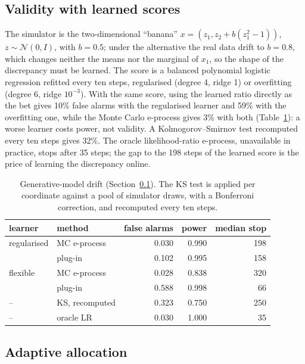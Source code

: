 \documentclass[12pt]{article}
\theoremstyle{remark}
\def\spacingset#1{\renewcommand{\baselinestretch}%
{#1}\small\normalsize} \spacingset{1}
\begin{document}
\subsection{Validity with learned scores}\label{sec:exp-drift}

The simulator is the two-dimensional ``banana''
$x = (z_1, z_2 + b(z_1^2 - 1))$, $z \sim \mathcal N(0, I)$, with $b = 0.5$; under
the alternative the real data drift to $b = 0.8$, which changes neither the
means nor the marginal of $x_1$, so the shape of the discrepancy must be
learned. The score is a balanced polynomial logistic regression refitted every
ten steps, regularised (degree 4, ridge 1) or overfitting (degree 6, ridge
$10^{-3}$). With the same score, using the learned ratio directly as the bet
gives 10\% false alarms with the regularised learner and 59\% with the
overfitting one, while the Monte Carlo e-process gives 3\% with both
(Table~\ref{tab:drift}): a worse learner costs power, not validity. A
Kolmogorov--Smirnov test recomputed every ten steps gives 32\%. The oracle
likelihood-ratio e-process, unavailable in practice, stops after 35 steps;
the gap to the 198 steps of the learned score is the price of learning the
discrepancy online.

\begin{table}[tp]
\spacingset{1}
\centering
\caption{Generative-model drift (Section~\ref{sec:exp-drift}). The KS test is
applied per coordinate against a pool of simulator draws, with a Bonferroni
correction, and recomputed every ten steps.}
\label{tab:drift}
\begin{tabular}{llrrr}
\toprule
learner & method & false alarms & power & median stop \\
\midrule
regularised & MC e-process & 0.030 & 0.990 & 198 \\
 & plug-in & 0.102 & 0.995 & 158 \\
flexible & MC e-process & 0.028 & 0.838 & 320 \\
 & plug-in & 0.588 & 0.998 & 66 \\
-- & KS, recomputed & 0.323 & 0.750 & 250 \\
-- & oracle LR & 0.030 & 1.000 & 35 \\
\bottomrule
\end{tabular}
\end{table}

\subsection{Adaptive allocation}\label{sec:exp-bandit}
\end{document}
